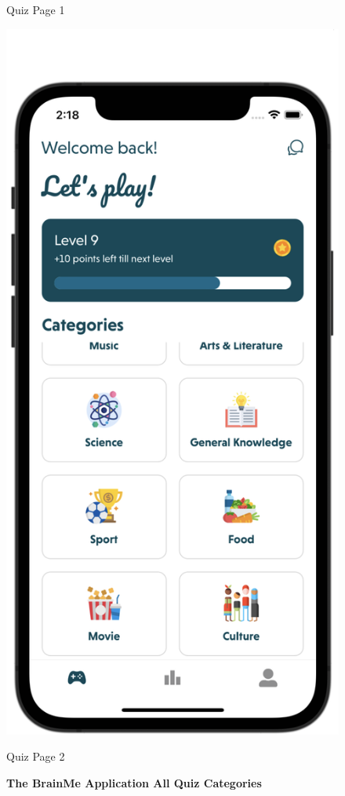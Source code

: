 \begin{figure}[H]
\begin{minipage}[b]{0.43\linewidth}
        \caption{Quiz Page 1}
    \end{minipage}
    \hspace{0.1\linewidth}
    \begin{minipage}[b]{0.43\linewidth}
        \centering
        \includegraphics[width=\linewidth]{Mobile UI/Quiz Page 2.png}
        \caption{Quiz Page 2}
    \end{minipage}
    \vspace{0.5cm}
    \caption{\textbf{The BrainMe Application All Quiz Categories}}
\end{figure}


